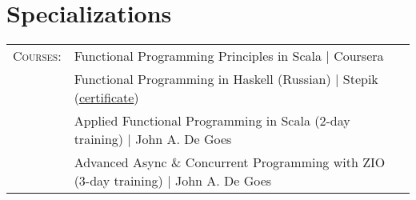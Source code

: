 \documentclass[a4paper,11pt]{article}
\begin{document}
\section{Specializations}
\begin{tabular}{rl}
  \textsc{Courses:}
  &Functional Programming Principles in Scala | Coursera\\
  &Functional Programming in Haskell (Russian) | Stepik (\href{https://stepik.org/cert/53556}{certificate})\\
  &Applied Functional Programming in Scala (2-day training) | John A. De Goes\\
  &Advanced Async \& Concurrent Programming with ZIO (3-day training) | John A. De Goes
\end{tabular}
\end{document}
